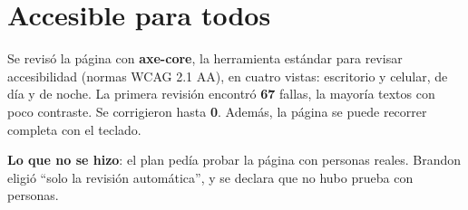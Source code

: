 \section{Accesible para todos}
Se revisó la página con \textbf{axe-core}, la herramienta estándar para revisar accesibilidad (normas WCAG 2.1 AA), en cuatro
vistas: escritorio y celular, de día y de noche. La primera revisión encontró \textbf{67} fallas, la mayoría textos con poco
contraste. Se corrigieron hasta \textbf{0}. Además, la página se puede recorrer completa con el teclado.

\textbf{Lo que no se hizo}: el plan pedía probar la página con personas reales. Brandon eligió ``solo la revisión
automática'', y se declara que no hubo prueba con personas.

